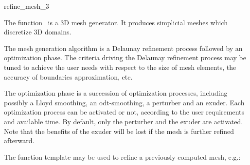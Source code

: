 \ccRefPageBegin


\begin{ccRefFunction}{refine_mesh_3}  %


\ccDefinition

The function \ccRefName\ is a 3D
 mesh generator. It produces simplicial meshes which discretize
 3D domains.

The mesh generation algorithm is a Delaunay refinement process
followed by an optimization phase. 
The  criteria driving the Delaunay refinement
process may be tuned to achieve the user needs with respect to
the size of mesh elements, the accuracy of boundaries approximation,
etc.

The optimization phase is a succession of optimization processes,
including possibly a Lloyd smoothing, an odt-smoothing,
a perturber and an exuder.
 Each optimization process
can be activated or not,
 according to the user requirements
and available time. 
By default, only the perturber and  the exuder are activated.
Note that the benefits of the exuder will be lost if the mesh
is further refined  afterward.
 








\begin{ccAdvanced}
The function template \ccRefName{} may be used to refine a previously
computed mesh, e.g.:


\end{ccAdvanced}
\end{ccRefFunction}
